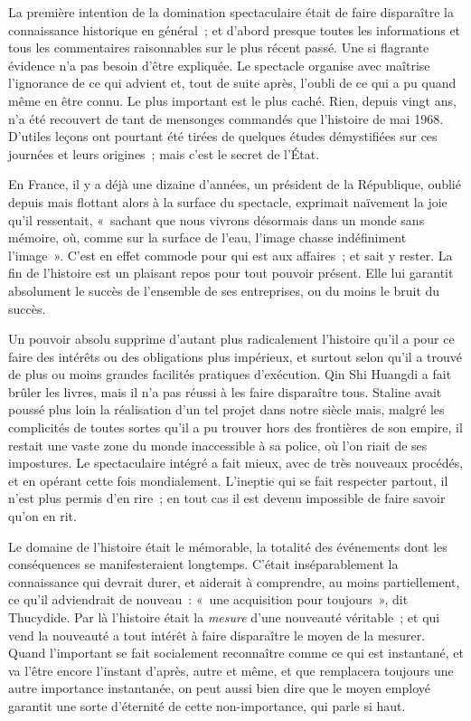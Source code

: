 \documentclass[french,twoside]{book} %
\def\mednobreak{\ifdim\lastskip<\medskipamount
  \removelastskip\nopagebreak\medskip\fi}
\newcommand{\labelblock}[1]{\medbreak{\noindent\color{rubric}\bfseries #1}\par\mednobreak}
\begin{document}
\labelblock{VI}

\noindent La première intention de la domination spectaculaire était de faire disparaître la connaissance historique en général ; et d’abord presque toutes les informations et tous les commentaires raisonnables sur le plus récent passé. Une si flagrante évidence n’a pas besoin d’être expliquée. Le spectacle organise avec maîtrise l’ignorance de ce qui advient et, tout de suite après, l’oubli de ce qui a pu quand même en être connu. Le plus important est le plus caché. Rien, depuis vingt ans, n’a été recouvert de tant de mensonges commandés que l’histoire de mai 1968. D’utiles leçons ont pourtant été tirées de quelques études démystifiées sur ces journées et leurs origines ; mais c’est le secret de l’État.\par
En France, il y a déjà une dizaine d’années, un président de la République, oublié depuis mais flottant alors à la surface du spectacle, exprimait naïvement la joie qu’il ressentait, « sachant que nous vivrons désormais dans un monde sans mémoire, où, comme sur la surface de l’eau, l’image chasse indéfiniment l’image ». C’est en effet commode pour qui est aux affaires ; et sait y rester. La fin de l’histoire est un plaisant repos pour tout pouvoir présent. Elle lui garantit absolument le succès de l’ensemble de ses entreprises, ou du moins le bruit du succès.\par
Un pouvoir absolu supprime d’autant plus radicalement l’histoire qu’il a pour ce faire des intérêts ou des obligations plus impérieux, et surtout selon qu’il a trouvé de plus ou moins grandes facilités pratiques d’exécution. Qin Shi Huangdi a fait brûler les livres, mais il n’a pas réussi à les faire disparaître tous. Staline avait poussé plus loin la réalisation d’un tel projet dans notre siècle mais, malgré les complicités de toutes sortes qu’il a pu trouver hors des frontières de son empire, il restait une vaste zone du monde inaccessible à sa police, où l’on riait de ses impostures. Le spectaculaire intégré a fait mieux, avec de très nouveaux procédés, et en opérant cette fois mondialement. L’ineptie qui se fait respecter partout, il n’est plus permis d’en rire ; en tout cas il est devenu impossible de faire savoir qu’on en rit.\par
Le domaine de l’histoire était le mémorable, la totalité des événements dont les conséquences se manifesteraient longtemps. C’était inséparablement la connaissance qui devrait durer, et aiderait à comprendre, au moins partiellement, ce qu’il adviendrait de nouveau : « une acquisition pour toujours », dit Thucydide. Par là l’histoire était la \emph{mesure} d’une nouveauté véritable ; et qui vend la nouveauté a tout intérêt à faire disparaître le moyen de la mesurer. Quand l’important se fait socialement reconnaître comme ce qui est instantané, et va l’être encore l’instant d’après, autre et même, et que remplacera toujours une autre importance instantanée, on peut aussi bien dire que le moyen employé garantit une sorte d’éternité de cette non-importance, qui parle si haut.\par
\end{document}
